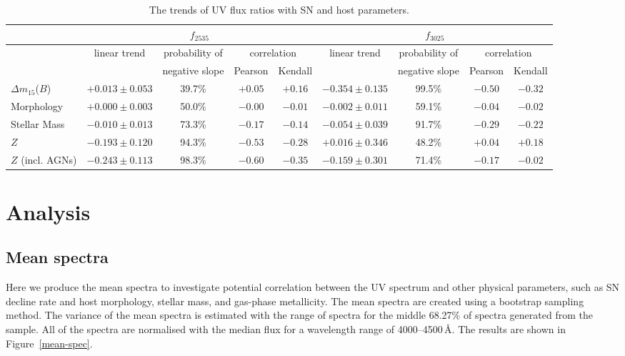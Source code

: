 \documentclass[useAMS,usenatbib]{mn2e}
\newcommand{\deltam}{\ensuremath{\Delta m_{15}}}
\begin{document}
\begin{figure}
        \label{flux-ratio}
\end{figure}

\begin{table}
\centering
\caption{The trends of UV flux ratios with SN and host parameters.}
\begin{tabular}{lcccccccc}
\hline\hline
   & \multicolumn{4}{c}{$f_{2535}$} & \multicolumn{4}{c}{$f_{3025}$}\\
\hline
   & linear trend & probability of & \multicolumn{2}{c}{correlation} & linear trend & probability of & \multicolumn{2}{c}{correlation} \\
   &              & negative slope & Pearson & Kendall &              & negative slope & Pearson & Kendall \\ 
\hline
$\deltam$($B$) & $+0.013 \pm 0.053$ & 39.7\% & $+0.05$ & $+0.16$ & $-0.354 \pm 0.135$ & 99.5\% & $-0.50$ & $-0.32$\\
Morphology   & $+0.000 \pm 0.003$ & 50.0\% & $-0.00$ & $-0.01$ & $-0.002 \pm 0.011$ & 59.1\% & $-0.04$ & $-0.02$\\
Stellar Mass & $-0.010 \pm 0.013$ & 73.3\% & $-0.17$ & $-0.14$ & $-0.054 \pm 0.039$ & 91.7\% & $-0.29$ & $-0.22$\\
$Z$            & $-0.193 \pm 0.120$ & 94.3\% & $-0.53$ & $-0.28$ & $+0.016 \pm 0.346$ & 48.2\% & $+0.04$ & $+0.18$\\
$Z$ (incl. AGNs)& $-0.243 \pm 0.113$ & 98.3\% & $-0.60$ & $-0.35$ & $-0.159 \pm 0.301$ & 71.4\% & $-0.17$ & $-0.02$\\
\hline
\end{tabular}
\label{uvflux-statistic}
\end{table}

\section{Analysis}
\label{sec:analysis}
\subsection{Mean spectra}
\label{sec:mean-spectra}
Here we produce the mean spectra to investigate potential correlation between the UV spectrum and other physical parameters, such as SN decline rate and host morphology, stellar mass, and gas-phase metallicity. The mean spectra are created using a bootstrap sampling method. The variance of the mean spectra is estimated with the range of spectra for the middle 68.27\% of spectra generated from the sample. All of the spectra are normalised with the median flux for a wavelength range of 4000--4500\,\AA. The results are shown in Figure~\ref{mean-spec}. 
\end{document}
